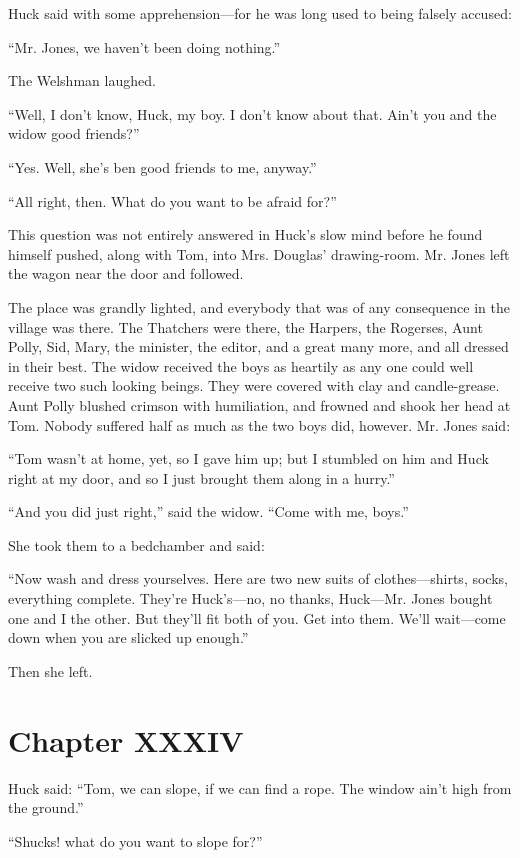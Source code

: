 \documentclass{book}
\begin{document}
Huck said with some apprehension—for he was long used to being falsely accused:

“Mr. Jones, we haven’t been doing nothing.”

The Welshman laughed.

“Well, I don’t know, Huck, my boy. I don’t know about that. Ain’t you and the widow good friends?”

“Yes. Well, she’s ben good friends to me, anyway.”

“All right, then. What do you want to be afraid for?”

This question was not entirely answered in Huck’s slow mind before he found himself pushed, along with Tom, into Mrs. Douglas’ drawing-room. Mr. Jones left the wagon near the door and followed.

The place was grandly lighted, and everybody that was of any consequence in the village was there. The Thatchers were there, the Harpers, the Rogerses, Aunt Polly, Sid, Mary, the minister, the editor, and a great many more, and all dressed in their best. The widow received the boys as heartily as any one could well receive two such looking beings. They were covered with clay and candle-grease. Aunt Polly blushed crimson with humiliation, and frowned and shook her head at Tom. Nobody suffered half as much as the two boys did, however. Mr. Jones said:

“Tom wasn’t at home, yet, so I gave him up; but I stumbled on him and Huck right at my door, and so I just brought them along in a hurry.”

“And you did just right,” said the widow. “Come with me, boys.”

She took them to a bedchamber and said:

“Now wash and dress yourselves. Here are two new suits of clothes—shirts, socks, everything complete. They’re Huck’s—no, no thanks, Huck—Mr. Jones bought one and I the other. But they’ll fit both of you. Get into them. We’ll wait—come down when you are slicked up enough.”

Then she left.

\chapter*{Chapter XXXIV}

Huck said: “Tom, we can slope, if we can find a rope. The window ain’t high from the ground.”

“Shucks! what do you want to slope for?”
\end{document}
